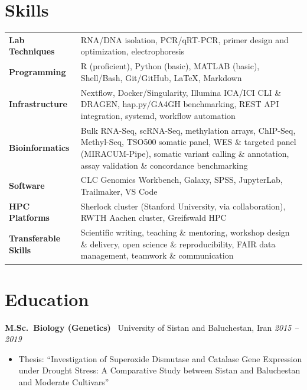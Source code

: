 \documentclass[10pt, a4paper]{article}
\newcommand{\cventry}[4]{%
  \noindent
  \textbf{#2} \textbar\ #3, #4 \hfill \textit{#1}\par\vspace{0pt}
}
\begin{document}
\section{Skills}

\begin{tabular}{@{}>{\bfseries}p{4.5cm}p{11.5cm}@{}}
  Lab Techniques       & RNA/DNA isolation, PCR/qRT-PCR, primer design and optimization, electrophoresis \\[0pt]
  Programming          & R (proficient), Python (basic), MATLAB (basic), Shell/Bash, Git/GitHub, \LaTeX, Markdown \\[0pt]
  Infrastructure       & Nextflow, Docker/Singularity, Illumina ICA/ICI CLI \& DRAGEN,
                         hap.py/GA4GH benchmarking, REST API integration, systemd,
                         workflow automation \\[0pt]
  Bioinformatics       & Bulk RNA-Seq, scRNA-Seq, methylation arrays, ChIP-Seq, Methyl-Seq,
                         TSO500 somatic panel, WES \& targeted panel (MIRACUM-Pipe),
                         somatic variant calling \& annotation,
                         assay validation \& concordance benchmarking \\[0pt]
  Software             & CLC Genomics Workbench, Galaxy, SPSS, JupyterLab, Trailmaker, VS Code \\[0pt]
  HPC Platforms        & Sherlock cluster (Stanford University, via collaboration), RWTH Aachen cluster,
                         Greifswald HPC \\[0pt]
  Transferable Skills  & Scientific writing, teaching \& mentoring, workshop design \& delivery,
                         open science \& reproducibility, FAIR data management, teamwork \& communication \\
\end{tabular}

\section{Education}

\cventry{2015 -- 2019}
  {M.Sc.\ Biology (Genetics)}
  {University of Sistan and Baluchestan}
  {Iran}
\begin{itemize}
  \item Thesis: ``Investigation of Superoxide Dismutase and Catalase Gene Expression under Drought Stress:
        A Comparative Study between Sistan and Baluchestan and Moderate Cultivars''
\end{itemize}
\end{document}
